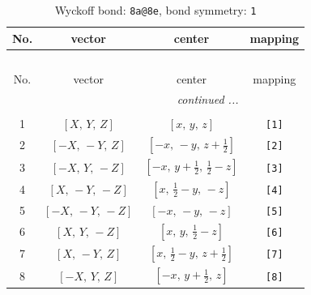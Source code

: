 \documentclass[fleqn,8pt]{jsarticle}
\begin{document}
\begin{longtable}{cccc}
\caption{Wyckoff bond: {\tt 8a@8e}, bond symmetry: {\tt 1}}
 \\
 \hline \hline
No. & vector & center & mapping \\ \hline \endfirsthead

\multicolumn{3}{l}{\tablename\ \thetable{}} \\
 \hline \hline
No. & vector & center & mapping \\ \hline \endhead

 \hline \hline
\multicolumn{3}{r}{\footnotesize\it continued ...} \\ \endfoot

 \hline \hline
\multicolumn{3}{r}{} \\ \endlastfoot

1 & $\left[ X,\, Y,\, Z \right]$ & $\left[ x,\, y,\, z \right]$ & {\tt [1]} \\ \hline
2 & $\left[ - X,\, - Y,\, Z \right]$ & $\left[ - x,\, - y,\, z + \frac{1}{2} \right]$ & {\tt [2]} \\ \hline
3 & $\left[ - X,\, Y,\, - Z \right]$ & $\left[ - x,\, y + \frac{1}{2},\, \frac{1}{2} - z \right]$ & {\tt [3]} \\ \hline
4 & $\left[ X,\, - Y,\, - Z \right]$ & $\left[ x,\, \frac{1}{2} - y,\, - z \right]$ & {\tt [4]} \\ \hline
5 & $\left[ - X,\, - Y,\, - Z \right]$ & $\left[ - x,\, - y,\, - z \right]$ & {\tt [5]} \\ \hline
6 & $\left[ X,\, Y,\, - Z \right]$ & $\left[ x,\, y,\, \frac{1}{2} - z \right]$ & {\tt [6]} \\ \hline
7 & $\left[ X,\, - Y,\, Z \right]$ & $\left[ x,\, \frac{1}{2} - y,\, z + \frac{1}{2} \right]$ & {\tt [7]} \\ \hline
8 & $\left[ - X,\, Y,\, Z \right]$ & $\left[ - x,\, y + \frac{1}{2},\, z \right]$ & {\tt [8]} \\
\end{longtable}
\end{document}
